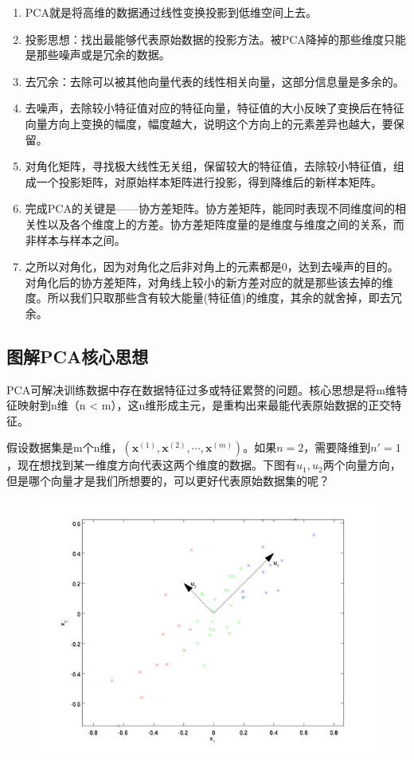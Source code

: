 \begin{enumerate}
\def\labelenumi{\arabic{enumi}.}
\item
  PCA就是将高维的数据通过线性变换投影到低维空间上去。
\item
  投影思想：找出最能够代表原始数据的投影方法。被PCA降掉的那些维度只能是那些噪声或是冗余的数据。
\item
  去冗余：去除可以被其他向量代表的线性相关向量，这部分信息量是多余的。
\item
  去噪声，去除较小特征值对应的特征向量，特征值的大小反映了变换后在特征向量方向上变换的幅度，幅度越大，说明这个方向上的元素差异也越大，要保留。
\item
  对角化矩阵，寻找极大线性无关组，保留较大的特征值，去除较小特征值，组成一个投影矩阵，对原始样本矩阵进行投影，得到降维后的新样本矩阵。
\item
  完成PCA的关键是------协方差矩阵。协方差矩阵，能同时表现不同维度间的相关性以及各个维度上的方差。协方差矩阵度量的是维度与维度之间的关系，而非样本与样本之间。
\item
  之所以对角化，因为对角化之后非对角上的元素都是0，达到去噪声的目的。对角化后的协方差矩阵，对角线上较小的新方差对应的就是那些该去掉的维度。所以我们只取那些含有较大能量(特征值)的维度，其余的就舍掉，即去冗余。
\end{enumerate}

\subsection{图解PCA核心思想}\label{ux56feux89e3pcaux6838ux5fc3ux601dux60f3}

​
PCA可解决训练数据中存在数据特征过多或特征累赘的问题。核心思想是将m维特征映射到n维（n
\textless{} m），这n维形成主元，是重构出来最能代表原始数据的正交特征。

​
假设数据集是m个n维，$(\boldsymbol x^{(1)}, \boldsymbol x^{(2)}, \cdots, \boldsymbol x^{(m)})$。如果$n=2$，需要降维到$n'=1$，现在想找到某一维度方向代表这两个维度的数据。下图有$u_1, u_2$两个向量方向，但是哪个向量才是我们所想要的，可以更好代表原始数据集的呢？

\begin{figure}
\centering
\includegraphics{./img/ch2/2.34/1.png}
\caption{}
\end{figure}

